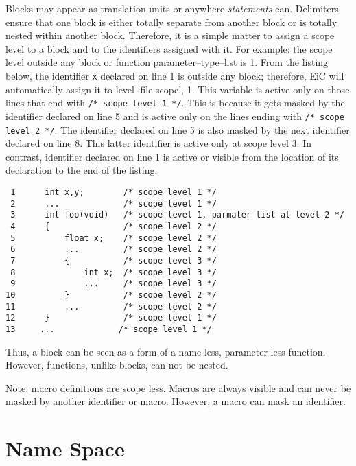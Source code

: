 Blocks may appear as translation units or anywhere {\it statements}
can.  Delimiters ensure that one block is either totally separate from
another block or is totally nested within another block. Therefore, it
is a simple matter to assign a scope level to a block and to the
identifiers assigned with it. For example: the scope level outside any
block or function parameter--type--list is 1. From the listing below,
the identifier {\tt x} declared on line 1 is outside any block;
therefore, EiC will automatically assign it to level `file scope',
1. This variable is active only on those lines that end with
\verb+/* scope level 1 */+. This is because it gets masked by the 
identifier  declared on line 5 and is active only on the lines
ending with \verb+/* scope level 2 */+. The  identifier declared
on line 5 is also masked by the next identifier  declared on line
8. This latter identifier is active only at scope level 3. In
contrast, identifier  declared on line 1 is active or visible
from the location of its declaration to the end of the listing.

\begin{production}
\begin{verbatim}
 1      int x,y;        /* scope level 1 */
 2      ...             /* scope level 1 */
 3      int foo(void)   /* scope level 1, parmater list at level 2 */   
 4      {               /* scope level 2 */
 5          float x;    /* scope level 2 */
 6          ...         /* scope level 2 */
 7          {           /* scope level 3 */
 8              int x;  /* scope level 3 */
 9              ...     /* scope level 3 */
10          }           /* scope level 2 */
11          ...         /* scope level 2 */
12      }               /* scope level 1 */
13     ...             /* scope level 1 */
\end{verbatim}
\end{production}

Thus, a block can be seen as a form of a name-less, parameter-less
function. However, functions, unlike blocks, can not be nested.

Note: macro definitions are scope less. Macros are always visible and
can never be masked by another identifier or macro. However, a macro
can mask an identifier.


\section{Name Space}
\label{sec:NameSpace}

